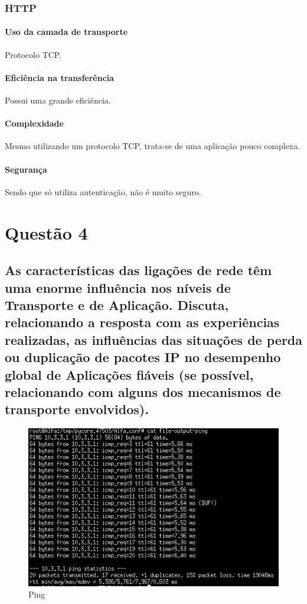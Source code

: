 \documentclass[a4paper]{report}
\begin{document}
\subsection{HTTP}

\subsubsection{Uso da camada de transporte}

Protocolo TCP.

\subsubsection{Eficiência na transferência}

Possui uma grande eficiência.

\subsubsection{Complexidade}

Mesmo utilizando um protocolo TCP, trata-se de uma aplicação pouco complexa.

\subsubsection{Segurança}

Sendo que só utiliza autenticação, não é muito seguro.

\chapter{Questão 4}

\section{As características das ligações de rede têm uma enorme influência nos níveis de Transporte e de Aplicação. Discuta,
relacionando a resposta com as experiências realizadas, as influências das situações de perda ou duplicação de pacotes IP no
desempenho global de Aplicações fiáveis (se possível, relacionando com alguns dos mecanismos de transporte envolvidos).}

\begin{figure}[H]
    \centering 
    \includegraphics[width=\textwidth]{images/4.png}  
    \caption{Ping}
    \label{fig:4}
\end{figure}
\end{document}
